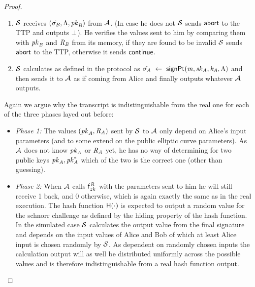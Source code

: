 \begin{proof}
\begin{enumerate}
        \item $\mathcal{S}$ receives $(\tilde{\sigma_{\mathit{B}}}, \Lambda, \mathit{pk}_{\mathit{B}})$ from $\mathcal{A}$.
        (In case he does not $\mathcal{S}$ sends $\mathsf{abort}$ to the TTP and outputs $\bot$).
        He verifies the values sent to him by comparing them with $\mathit{pk}_{\mathit{B}}$ and $\mathit{R}_{\mathit{B}}$ from its memory, if they are found to be invalid $\mathcal{S}$ sends $\mathsf{abort}$ to the TTP, otherwise it sends $\mathsf{continue}$.
        \item $\mathcal{S}$ calculates as defined in the protocol as $\tilde{\sigma_{\mathit{A}}} ~\leftarrow~ \mathsf{signPt}(\mathit{m}, \mathit{sk}_{\mathit{A}}, \mathit{\mathit{k}_{\mathit{A}}}, \Lambda)$ and then sends it to $\mathcal{A}$ as if coming from Alice and finally outputs whatever $\mathcal{A}$ outputs.
    \end{enumerate}
    Again we argue why the transcript is indistinguishable from the real one for each of the three phases layed out before:
    \begin{itemize}
        \item \textit{Phase 1: } The values $(\mathit{pk}_{\mathit{A}}, \mathit{R}_{\mathit{A}})$ sent by $\mathcal{S}$ to $\mathcal{A}$ only depend on Alice's input parameters (and to some extend on the public elliptic curve parameters).
        As $\mathcal{A}$ does not know $\mathit{pk}_{\mathit{A}}$ or $\mathit{R}_{\mathit{A}}$ yet, he has no way of determining for two public keys $\mathit{pk}_{\mathit{A}}, \mathit{pk}_{\mathit{A}}^*$ which of the two is the correct one (other than guessing).
        \item \textit{Phase 2: } When $\mathcal{A}$ calls $\mathsf{f}^{\mathit{R}}_{zk}$ with the parameters sent to him he will still receive 1 back, and 0 otherwise, which is again exactly the same as in the real execution.
        The hash function $\mathsf{H} (\cdot)$ is expected to output a random value for the schnorr challenge as defined by the hiding property of the hash function. 
        In the simulated case $\mathcal{S}$ calculates the output value from the final signature and depends on the input values of Alice and Bob of which at least Alice input is chosen randomly by $\mathcal{S}$.
        As dependent on randomly chosen inputs the calculation output will as well be distributed uniformly across the possible values and is therefore indistinguishable from a real hash function output.

\end{itemize}
\end{proof}
